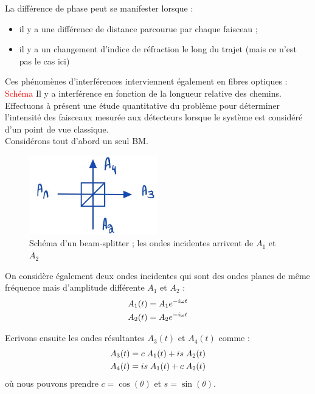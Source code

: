 \documentclass[../notesdecours.tex]{subfiles}
\begin{document}
La différence de phase peut se manifester lorsque : 
\begin{itemize}[label = \textbullet]
    \item il y a une différence de distance parcourue par chaque faisceau ; 
    \item il y a un changement d'indice de réfraction le long du trajet (mais ce n'est pas le cas ici)
\end{itemize}

Ces phénomènes d'interférences interviennent également en fibres optiques : 
\textcolor{red}{Schéma} 
\newline Il y a interférence en fonction de la longueur relative des chemins. \\

Effectuons à présent une étude quantitative du problème pour déterminer l'intensité des faisceaux mesurée aux détecteurs lorsque le système est considéré d'un point de vue classique. \\

Considérons tout d'abord un seul BM.

\begin{center}
    \begin{figure}[h]
    \centering
    \includegraphics[width=0.50\textwidth]{bean.png}
    \caption{Schéma d'un beam-splitter ; les ondes incidentes arrivent de $A_1$ et $A_2$}
    \label{Interferometre}
    \end{figure}
\end{center}

On considère également deux ondes incidentes qui sont des ondes planes de même fréquence mais d'amplitude différente $A_1$ et $A_2$ : 
\begin{align}
    A_1(t) &= A_1 e^{-i\omega t} \notag \\
    A_2(t) &= A_2 e^{-i\omega t}
\end{align}\label{A1 et A2}

Ecrivons ensuite les ondes résultantes $A_3(t)$ et $A_4(t)$ comme : 
\begin{align}
    A_3(t) &= c \; A_1(t) + i s \;A_2(t) \notag \\
    A_4(t) &= is \; A_1(t) + c \; A_2(t) 
\end{align}\label{A3 et A4}
où nous pouvons prendre $c = \cos(\theta)$ et $s = \sin(\theta)$. 
\end{document}
